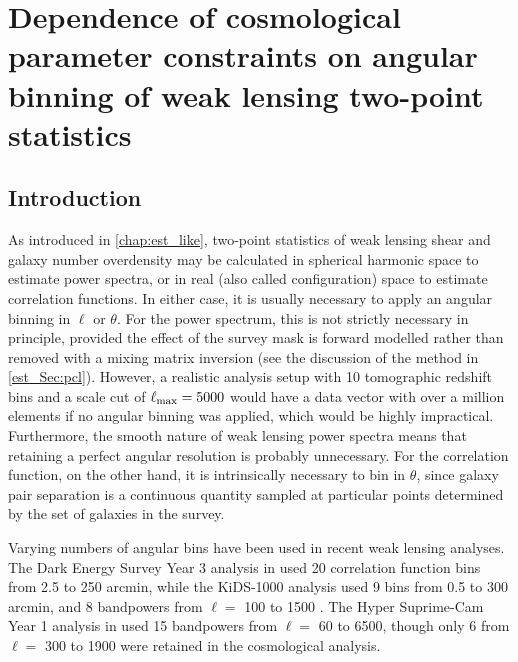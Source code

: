 
% 
% 

% 

\chapter{Dependence of cosmological parameter constraints on angular binning of weak lensing two-point statistics}
\label{chap:binning}
\graphicspath{{../Figs/binning/}{Figs/binning/}}

\section{Introduction}

As introduced in \autoref{chap:est_like}, two-point statistics of weak lensing shear and galaxy number overdensity may be calculated in spherical harmonic space to estimate power spectra, or in real (also called configuration) space to estimate correlation functions. In either case, it is usually necessary to apply an angular binning in $\ell$ or $\theta$. For the power spectrum, this is not strictly necessary in principle, provided the effect of the survey mask is forward modelled rather than removed with a mixing matrix inversion (see the discussion of the \pcl{} method in \autoref{est_Sec:pcl}). However, a realistic \ttp{} analysis setup with 10 tomographic redshift bins and a scale cut of $\ell_\text{max} = 5000$ would have a data vector with over a million elements if no angular binning was applied, which would be highly impractical. Furthermore, the smooth nature of weak lensing power spectra means that retaining a perfect angular resolution is probably unnecessary. For the correlation function, on the other hand, it is intrinsically necessary to bin in $\theta$, since galaxy pair separation is a continuous quantity sampled at particular points determined by the set of galaxies in the survey.

Varying numbers of angular bins have been used in recent weak lensing analyses. The Dark Energy Survey Year 3 analysis in \citet{DES2021} used 20 correlation function bins from 2.5 to 250 arcmin, while the KiDS-1000 analysis used 9 bins from 0.5 to 300 arcmin, and 8 bandpowers from $\ell = $ 100 to 1500 \citep{Joachimi2021, Heymans2021, Asgari2021}. The Hyper Suprime-Cam Year 1 \pcl{} analysis in \citet{Hikage2019} used 15 bandpowers from $\ell =$ 60 to 6500, though only 6 from $\ell =$ 300 to 1900 were retained in the cosmological analysis.


